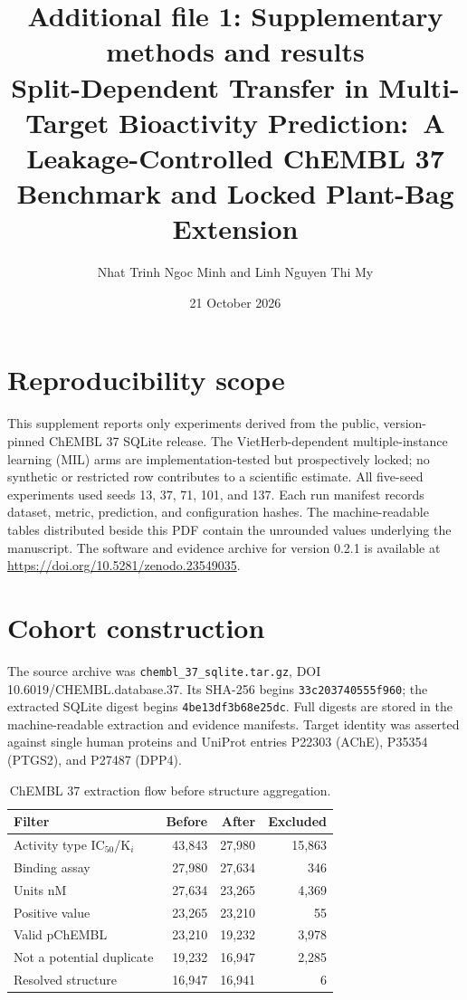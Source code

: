 \documentclass[11pt]{article}
\title{Additional file 1: Supplementary methods and results\\
\large Split-Dependent Transfer in Multi-Target Bioactivity Prediction:\
A Leakage-Controlled ChEMBL 37 Benchmark and Locked Plant-Bag Extension}
\author{Nhat Trinh Ngoc Minh and Linh Nguyen Thi My}
\date{21 October 2026}
\begin{document}
\onehalfspacing
\linenumbers
\maketitle

\section{Reproducibility scope}

This supplement reports only experiments derived from the public, version-pinned
ChEMBL 37 SQLite release. The VietHerb-dependent multiple-instance learning
(MIL) arms are implementation-tested but prospectively locked; no synthetic or
restricted row contributes to a scientific estimate. All five-seed experiments
used seeds 13, 37, 71, 101, and 137. Each run manifest records dataset, metric,
prediction, and configuration hashes. The machine-readable tables distributed
beside this PDF contain the unrounded values underlying the manuscript.
The software and evidence archive for version 0.2.1 is available at
\url{https://doi.org/10.5281/zenodo.23549035}.

\section{Cohort construction}

The source archive was \texttt{chembl\_37\_sqlite.tar.gz}, DOI
10.6019/CHEMBL.database.37. Its SHA-256 begins
\texttt{33c203740555f960}; the extracted SQLite digest begins
\texttt{4be13df3b68e25dc}. Full digests are stored in the machine-readable
extraction and evidence manifests.
Target identity was asserted against single human proteins and UniProt entries
P22303 (AChE), P35354 (PTGS2), and P27487 (DPP4).

\begin{table}[ht]
\centering
\caption{ChEMBL 37 extraction flow before structure aggregation.}
\begin{tabular}{lrrr}
\toprule
Filter & Before & After & Excluded\\
\midrule
Activity type IC$_{50}$/K$_i$ & 43,843 & 27,980 & 15,863\\
Binding assay & 27,980 & 27,634 & 346\\
Units nM & 27,634 & 23,265 & 4,369\\
Positive value & 23,265 & 23,210 & 55\\
Valid pChEMBL & 23,210 & 19,232 & 3,978\\
Not a potential duplicate & 19,232 & 16,947 & 2,285\\
Resolved structure & 16,947 & 16,941 & 6\\
\bottomrule
\end{tabular}
\end{table}
\end{document}

